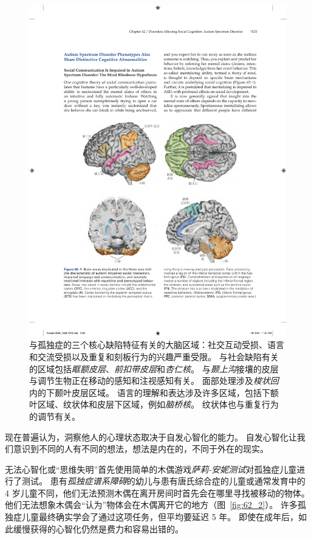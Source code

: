 \begin{figure}[htbp]
	\centering
	\includegraphics[width=0.98\linewidth]{chap62/fig_62_1}
	\caption{与孤独症的三个核心缺陷特征有关的大脑区域：社交互动受损、语言和交流受损以及重复和刻板行为的兴趣严重受限。
		与社会缺陷有关的区域包括\textit{眶额皮层}、\textit{前扣带皮层}和\textit{杏仁核}。
		与\textit{颞上沟}接壤的皮层与调节生物正在移动的感知和注视感知有关。
		面部处理涉及\textit{梭状回}内的下颞叶皮层区域。
		语言的理解和表达涉及许多区域，包括下额叶区域、纹状体和皮层下区域，例如\textit{脑桥核}。
		纹状体也与重复行为的调节有关。}
	\label{fig:62_1}
\end{figure}


现在普遍认为，洞察他人的心理状态取决于自发心智化的能力。
自发心智化让我们意识到不同的人有不同的想法，想法是内在的，不同于外在的现实。


无法心智化或“思维失明”首先使用简单的木偶游戏\textit{萨莉-安妮测试}对孤独症儿童进行了测试。
患有\textit{孤独症谱系障碍}的幼儿与患有唐氏综合症的儿童或通常发育中的 4 岁儿童不同，他们无法预测木偶在离开房间时首先会在哪里寻找被移动的物体。
他们无法想象木偶会“认为”物体会在木偶离开它的地方（图~\ref{fig:62_2}）。
许多孤独症儿童最终确实学会了通过这项任务，但平均要延迟 5 年。
即使在成年后，如此缓慢获得的心智化仍然是费力和容易出错的。


